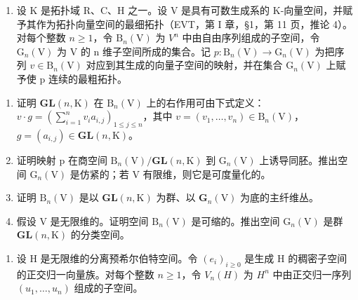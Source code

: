 \exercisegroup

\begin{enumerate}
\def\labelenumi{\arabic{enumi})}
\tightlist
\item
   设 K 是拓扑域 R、C、H 之一。设 V 是具有可数生成系的 K-向量空间，并赋予其作为拓扑向量空间的最细拓扑（EVT，第 I 章，§1，第 11 页，推论 4）。对每个整数 \(n \geqslant 1\)，令 \(\mathrm{B}_{n}(\mathrm{V})\) 为 \(V^{n}\) 中由自由序列组成的子空间，令 \(\mathrm{G}_{n}(\mathrm{V})\) 为 V 的 n 维子空间所成的集合。记 \(p: \mathrm{B}_{n}(\mathrm{V}) \to \mathrm{G}_{n}(\mathrm{V})\) 为把序列 \(v \in \mathrm{B}_{n}(\mathrm{V})\) 对应到其生成的向量子空间的映射，并在集合 \(\mathrm{G}_{n}(\mathrm{V})\) 上赋予使 p 连续的最粗拓扑。
\end{enumerate}

\begin{enumerate}
\def\labelenumi{\alph{enumi})}
\item
   证明 \(\mathbf{GL}(n,\mathrm{K})\) 在 \(\mathrm{B}_{n}(\mathrm{V})\) 上的右作用可由下式定义：\(v \cdot g = (\sum_{i=1}^{n} v_{i} a_{i,j})_{1 \leqslant j \leqslant n}\)，其中 \(v = (v_{1}, \ldots, v_{n}) \in \mathrm{B}_{n}(\mathrm{V})\)，\(g = (a_{i,j}) \in \mathbf{GL}(n, \mathrm{K})\)。
\item
   证明映射 p 在商空间 \(\mathrm{B}_{n}(\mathrm{V})/\mathbf{G}\mathbf{L}(n,\mathrm{K})\) 到 \(\mathrm{G}_{n}(\mathrm{V})\) 上诱导同胚。推出空间 \(\mathrm{G}_{n}(\mathrm{V})\) 是仿紧的；若 V 有限维，则它是可度量化的。
\item
   证明 \(\mathrm{B}_{n}(\mathrm{V})\) 是以 \(\mathbf{GL}(n,\mathrm{K})\) 为群、以 \(\mathbf{G}_{n}(\mathrm{V})\) 为底的主纤维丛。
\item
   假设 V 是无限维的。证明空间 \(\mathrm{B}_{n}(\mathrm{V})\) 是可缩的。推出空间 \(\mathrm{G}_{n}(\mathrm{V})\) 是群 \(\mathbf{GL}(n,\mathrm{K})\) 的分类空间。
\end{enumerate}

\begin{enumerate}
\def\labelenumi{\arabic{enumi})}
\setcounter{enumi}{1}
\tightlist
\item
  设 H 是无限维的分离预希尔伯特空间。令 \((e_{i})_{i\geqslant0}\) 是生成 H 的稠密子空间的正交归一向量族。对每个整数 \(n\geqslant1\)，令 \(V_{n}(H)\) 为 \(H^{n}\) 中由正交归一序列 \((u_{1},\ldots,u_{n})\) 组成的子空间。
\end{enumerate}


